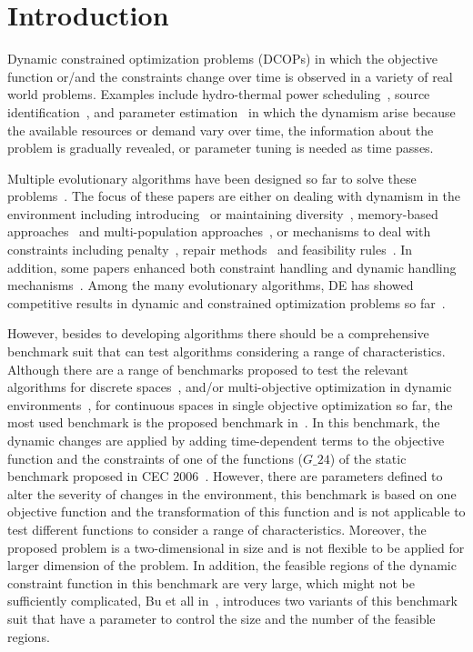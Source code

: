 \documentclass[conference]{IEEEtran}
\begin{document}
\section{Introduction}
\label{sec:Intro}
Dynamic constrained optimization problems (DCOPs) in which the objective function or/and the constraints change over time is observed in a variety of real world problems. Examples include hydro-thermal power scheduling~\cite{de2008plant}, source identification~\cite{liu2008adaptive}, and parameter estimation~\cite{prata2006simultaneous} in which the dynamism arise because the available resources or demand vary over time, the information about the problem is gradually revealed, or parameter tuning is needed as time passes.

Multiple evolutionary algorithms have been designed so far to solve these problems~\cite{ECDCOPs, Nguyen20121,Yaneli2016}. The focus of these papers are either on dealing with dynamism in the environment including introducing~\cite{Goh_2009} or maintaining diversity~\cite{Bui2005}, memory-based approaches~\cite{Richter2013} and multi-population approaches~\cite{branke2000multi}, or mechanisms to deal with constraints including penalty~\cite{CEC09}, repair methods~\cite{Das,bu2017continuous,nguyen2012continuous} and feasibility rules~\cite{Yaneli2016}.
In addition, some papers enhanced both constraint handling and dynamic handling mechanisms~\cite{Nguyen20121}.
Among the many evolutionary algorithms, DE has showed competitive results in dynamic and constrained optimization problems so far~\cite{ameca2018comparison}.

However, besides to developing algorithms there should be a comprehensive benchmark suit that can test algorithms considering a range of characteristics.
Although there are a range of benchmarks proposed to test the relevant algorithms for discrete spaces~\cite{roostapour2018performance}, and/or multi-objective optimization in dynamic environments~\cite{jiang2017evolutionary}, for continuous spaces in single objective optimization so far, the most used benchmark is the proposed benchmark in~\cite{Nguyen20121}. In this benchmark, the dynamic changes are applied by adding time-dependent terms to the objective function and the constraints of one of the functions ($G\_24$) of the static benchmark proposed in CEC 2006~\cite{liang2006problem}. However, there are parameters defined to alter the severity of changes in the environment, this benchmark is based on one objective function and the transformation of this function and is not applicable to test different functions to consider a range of characteristics. Moreover, the proposed problem is a two-dimensional in size and is not flexible to be applied for larger dimension of the problem.
In addition, the feasible regions of the dynamic constraint function in this benchmark are very large, which might not be sufficiently complicated, Bu et all in~\cite{bu2017continuous}, introduces two variants of this benchmark suit that have a parameter to control the size and the number of the feasible regions.
\end{document}

